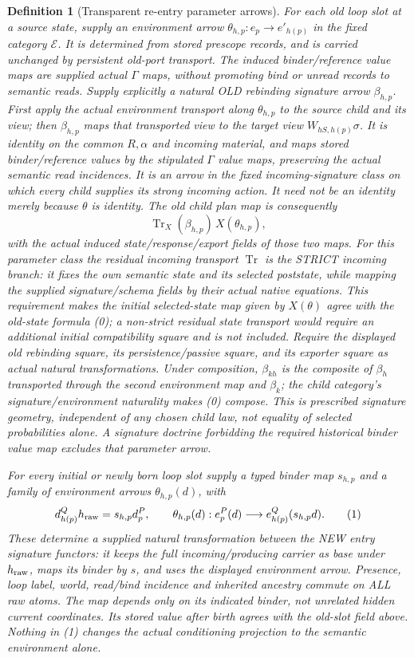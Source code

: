 \documentclass[11pt]{article}
\newtheorem{definition}{Definition}\newtheorem{theorem}{Theorem}\newtheorem{proposition}{Proposition}
\begin{document}
\begin{definition}[Transparent re-entry parameter arrows]
For each old loop slot at a source state, supply an environment arrow
$\theta_{h,p}:e_p\to e'_{h(p)}$ in the fixed category $\mathcal E$. It is determined from stored prescope records, and is carried unchanged by persistent old-port transport. The induced binder/reference value maps are supplied actual $\Gamma$ maps, without promoting bind or unread records to semantic reads. Supply explicitly a natural OLD rebinding signature arrow $\beta_{h,p}$. First apply the actual environment transport along $\theta_{h,p}$ to the source child and its view; then $\beta_{h,p}$ maps that transported view to the target view $W_{hS,h(p)}\sigma$. It is identity on the common $R,\alpha$ and incoming material, and maps stored binder/reference values by the stipulated $\Gamma$ value maps, preserving the actual semantic read incidences. It is an arrow in the fixed incoming-signature class on which every child supplies its strong incoming action. It need not be an identity merely because $\theta$ is identity. The old child plan map is consequently
\[
 \operatorname{Tr}_{X}(\beta_{h,p})\,X(\theta_{h,p}),       \tag{0}
\]
with the actual induced state/response/export fields of those two maps. For this parameter class the residual incoming transport $\operatorname{Tr}$ is the STRICT incoming branch: it fixes the own semantic state and its selected poststate, while mapping the supplied signature/schema fields by their actual native equations. This requirement makes the initial selected-state map given by $X(\theta)$ agree with the old-state formula (0); a non-strict residual state transport would require an additional initial compatibility square and is not included. Require the displayed old rebinding square, its persistence/passive square, and its exporter square as actual natural transformations. Under composition, $\beta_{kh}$ is the composite of $\beta_h$ transported through the second environment map and $\beta_k$; the child category's signature/environment naturality makes (0) compose. This is prescribed signature geometry, independent of any chosen child law, not equality of selected probabilities alone. A signature doctrine forbidding the required historical binder value map excludes that parameter arrow.

For every initial or newly born loop slot supply a typed binder map $s_{h,p}$ and a family of environment arrows $\theta_{h,p}(d)$, with
\[
 d^Q_{h(p)}h_{\rm raw}=s_{h,p}d^P_p,
 \qquad \theta_{h,p}(d):e^P_p(d)\longrightarrow e^Q_{h(p)}(s_{h,p}d).
 \tag{1}
\]
These determine a supplied natural transformation between the NEW entry signature functors: it keeps the full incoming/producing carrier as base under $h_{\rm raw}$, maps its binder by $s$, and uses the displayed environment arrow. Presence, loop label, world, read/bind incidence and inherited ancestry commute on ALL raw atoms. The map depends only on its indicated binder, not unrelated hidden current coordinates. Its stored value after birth agrees with the old-slot field above. Nothing in (1) changes the actual conditioning projection to the semantic environment alone.


\end{definition}
\end{document}
